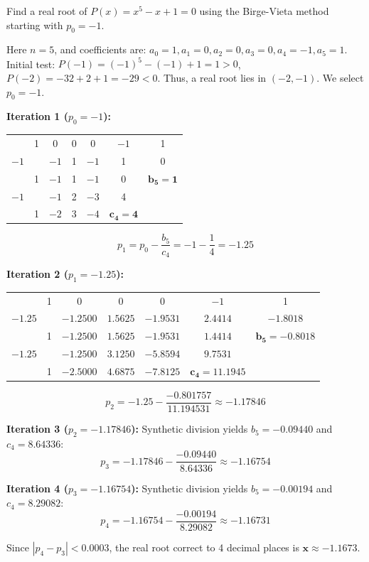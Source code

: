 \documentclass[11pt,a4paper]{article}
\begin{document}
\begin{exambox}
Find a real root of $P(x) = x^5 - x + 1 = 0$ using the Birge-Vieta method starting with $p_0 = -1$.
\end{exambox}

\begin{solbox}[Solution]
Here $n = 5$, and coefficients are: $a_0 = 1, a_1 = 0, a_2 = 0, a_3 = 0, a_4 = -1, a_5 = 1$.
Initial test: $P(-1) = (-1)^5 - (-1) + 1 = 1 > 0$, $P(-2) = -32 + 2 + 1 = -29 < 0$. Thus, a real root lies in $(-2, -1)$. We select $p_0 = -1$.

\textbf{Iteration 1 ($p_0 = -1$):}
\begin{center}
\begin{tabular}{c|cccccc}
    & 1 & 0 & 0 & 0 & $-1$ & 1 \\
    $-1$ & & $-1$ & 1 & $-1$ & 1 & 0 \\
    \hline
    & 1 & $-1$ & 1 & $-1$ & 0 & $\mathbf{b_5 = 1}$ \\
    $-1$ & & $-1$ & 2 & $-3$ & 4 & \\
    \hline
    & 1 & $-2$ & 3 & $-4$ & $\mathbf{c_4 = 4}$ &
\end{tabular}
\end{center}
$$p_1 = p_0 - \frac{b_5}{c_4} = -1 - \frac{1}{4} = \mathbf{-1.25}$$

\textbf{Iteration 2 ($p_1 = -1.25$):}
\begin{center}
\begin{tabular}{c|cccccc}
    & 1 & 0 & 0 & 0 & $-1$ & 1 \\
    $-1.25$ & & $-1.2500$ & $1.5625$ & $-1.9531$ & $2.4414$ & $-1.8018$ \\
    \hline
    & 1 & $-1.2500$ & $1.5625$ & $-1.9531$ & $1.4414$ & $\mathbf{b_5 = -0.8018}$ \\
    $-1.25$ & & $-1.2500$ & $3.1250$ & $-5.8594$ & $9.7531$ & \\
    \hline
    & 1 & $-2.5000$ & $4.6875$ & $-7.8125$ & $\mathbf{c_4 = 11.1945}$ &
\end{tabular}
\end{center}
$$p_2 = -1.25 - \frac{-0.801757}{11.194531} \approx \mathbf{-1.17846}$$

\textbf{Iteration 3 ($p_2 = -1.17846$):}
Synthetic division yields $b_5 = -0.09440$ and $c_4 = 8.64336$:
$$p_3 = -1.17846 - \frac{-0.09440}{8.64336} \approx \mathbf{-1.16754}$$

\textbf{Iteration 4 ($p_3 = -1.16754$):}
Synthetic division yields $b_5 = -0.00194$ and $c_4 = 8.29082$:
$$p_4 = -1.16754 - \frac{-0.00194}{8.29082} \approx \mathbf{-1.16731}$$

Since $|p_4 - p_3| < 0.0003$, the real root correct to 4 decimal places is $\mathbf{x \approx -1.1673}$.
\end{solbox}
\end{document}
